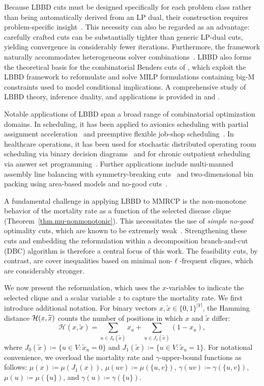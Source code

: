 Because LBBD cuts must be designed specifically for each problem class
rather than being automatically derived from an LP dual, their
construction requires problem-specific insight~\citep{Hooker2019}.
This necessity can also be regarded as an advantage: carefully crafted
cuts can be substantially tighter than generic LP-dual cuts, yielding
convergence in considerably fewer iterations. Furthermore, the
framework naturally accommodates heterogeneous solver combinations~\citep{Hooker2019}. LBBD also forms the
theoretical basis for the combinatorial Benders cuts of
\citet{Codato2006}, which exploit the LBBD framework to reformulate
and solve MILP formulations containing big-M constraints used to model
conditional implications. A comprehensive study of LBBD theory,
inference duality, and applications is provided in
\citet{Hooker2019} and \citet{hooker2023logic}.

Notable applications of LBBD span a broad range of combinatorial
optimization domains. In scheduling, it has been applied to avionics
scheduling with partial assignment acceleration~\citep{KARLSSON2022}
and preemptive flexible job-shop
scheduling~\citep{JUVIN2023106156}. In healthcare operations, it has
been used for stochastic distributed operating room scheduling via
binary decision diagrams~\citep{Guo2020} and for chronic outpatient
scheduling via answer set programming~\citep{CAPPANERA2023}. Further
applications include multi-manned assembly line balancing with
symmetry-breaking cuts~\citep{MICHELS2019796} and two-dimensional bin
packing using area-based models and no-good
cuts~\citep{Cote2020}.

A fundamental challenge in applying LBBD to MMRCP is the non-monotone
behavior of the mortality rate as a function of the selected disease
clique (Theorem~\ref{thm.mu-nonmonotonic}). This necessitates the
use of \textit{simple no-good} optimality cuts, which are known to be
extremely weak~\citep{hooker2023logic}. Strengthening these cuts and
embedding the reformulation within a decomposition branch-and-cut
(DBC) algorithm is therefore a central focus of this work. The
feasibility cuts, by contrast, are cover inequalities based on minimal
non-$\ell$-frequent cliques, which are considerably stronger.

We now present the reformulation, which uses the $x$-variables to
indicate the selected clique and a scalar variable $z$ to capture the
mortality rate. We first introduce additional notation. For binary
vectors $x, \widetilde{x} \in \{0,1\}^{|V|}$, the Hamming distance
$\mathcal{H}(x, \widetilde{x})$ counts the number of positions in which $x$
and $\widetilde{x}$ differ:
\[
\mathcal{H}(x, \widetilde{x}) = \sum_{u \in J_0(\widetilde{x})} x_u
+ \sum_{u \in J_1(\widetilde{x})} (1-x_u),
\]
where $J_0(\widetilde{x}) \coloneqq \{u \in V : \widetilde{x}_u = 0\}$
and $J_1(\widetilde{x}) \coloneqq \{u \in V : \widetilde{x}_u = 1\}$.
For notational convenience, we overload the mortality rate and
$\gamma$-upper-bound functions as follows: $\mu(x) \coloneqq
\mu(J_1(x))$, $\mu(uv) \coloneqq \mu(\{u,v\})$, $\gamma(uv)
\coloneqq \gamma(\{u,v\})$, $\mu(u) \coloneqq \mu(\{u\})$, and
$\gamma(u) \coloneqq \gamma(\{u\})$.

